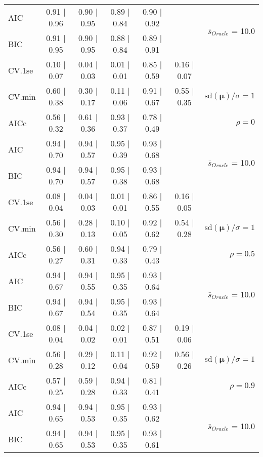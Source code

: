 \begin{table}
\begin{center}
\begin{tabular}{l*{5}{c}|r}
AIC & 0.91 $\mid$ 0.96 & 0.90 $\mid$ 0.95 & 0.89 $\mid$ 0.84 & 0.90 $\mid$ 0.92 & &  \multirow{2}{*}{$\bar{s}_{Oracle}$ = 10.0} \\
BIC & 0.91 $\mid$ 0.95 & 0.90 $\mid$ 0.95 & 0.88 $\mid$ 0.84 & 0.89 $\mid$ 0.91 & &  \\
 \hline 
CV.1se & 0.10 $\mid$ 0.07 & 0.04 $\mid$ 0.03 & 0.01 $\mid$ 0.01 & 0.85 $\mid$ 0.59 & 0.16 $\mid$ 0.07 & \\
CV.min & 0.60 $\mid$ 0.38 & 0.30 $\mid$ 0.17 & 0.11 $\mid$ 0.06 & 0.91 $\mid$ 0.67 & 0.55 $\mid$ 0.35 &  $\mathrm{sd}(\mathbf{\mu})/\sigma=1$ \\
AICc & 0.56 $\mid$ 0.32 & 0.61 $\mid$ 0.36 & 0.93 $\mid$ 0.37 & 0.78 $\mid$ 0.49 & & $\rho=0$ \\
AIC & 0.94 $\mid$ 0.70 & 0.94 $\mid$ 0.57 & 0.95 $\mid$ 0.39 & 0.93 $\mid$ 0.68 & &  \multirow{2}{*}{$\bar{s}_{Oracle}$ = 10.0} \\
BIC & 0.94 $\mid$ 0.70 & 0.94 $\mid$ 0.57 & 0.95 $\mid$ 0.38 & 0.93 $\mid$ 0.68 & &  \\
 \hline 
CV.1se & 0.08 $\mid$ 0.04 & 0.04 $\mid$ 0.03 & 0.01 $\mid$ 0.01 & 0.86 $\mid$ 0.55 & 0.16 $\mid$ 0.05 & \\
CV.min & 0.56 $\mid$ 0.30 & 0.28 $\mid$ 0.13 & 0.10 $\mid$ 0.05 & 0.92 $\mid$ 0.62 & 0.54 $\mid$ 0.28 &  $\mathrm{sd}(\mathbf{\mu})/\sigma=1$ \\
AICc & 0.56 $\mid$ 0.27 & 0.60 $\mid$ 0.31 & 0.94 $\mid$ 0.33 & 0.79 $\mid$ 0.43 & & $\rho=0.5$ \\
AIC & 0.94 $\mid$ 0.67 & 0.94 $\mid$ 0.55 & 0.95 $\mid$ 0.35 & 0.93 $\mid$ 0.64 & &  \multirow{2}{*}{$\bar{s}_{Oracle}$ = 10.0} \\
BIC & 0.94 $\mid$ 0.67 & 0.94 $\mid$ 0.54 & 0.95 $\mid$ 0.35 & 0.93 $\mid$ 0.64 & &  \\
 \hline 
CV.1se & 0.08 $\mid$ 0.04 & 0.04 $\mid$ 0.02 & 0.02 $\mid$ 0.01 & 0.87 $\mid$ 0.51 & 0.19 $\mid$ 0.06 & \\
CV.min & 0.56 $\mid$ 0.28 & 0.29 $\mid$ 0.12 & 0.11 $\mid$ 0.04 & 0.92 $\mid$ 0.59 & 0.56 $\mid$ 0.26 &  $\mathrm{sd}(\mathbf{\mu})/\sigma=1$ \\
AICc & 0.57 $\mid$ 0.25 & 0.59 $\mid$ 0.28 & 0.94 $\mid$ 0.33 & 0.81 $\mid$ 0.41 & & $\rho=0.9$ \\
AIC & 0.94 $\mid$ 0.65 & 0.94 $\mid$ 0.53 & 0.95 $\mid$ 0.35 & 0.93 $\mid$ 0.62 & &  \multirow{2}{*}{$\bar{s}_{Oracle}$ = 10.0} \\
BIC & 0.94 $\mid$ 0.65 & 0.94 $\mid$ 0.53 & 0.95 $\mid$ 0.35 & 0.93 $\mid$ 0.61 & &  \\

\end{tabular}
\end{center}
\end{table}
